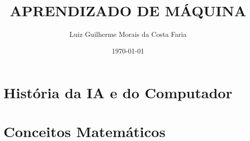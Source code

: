 \documentclass[
    12pt,            %
    a4paper,         %
    book,            %
    openright,       %
    twoside,         %
    brazil,          %
    citacao=authoryear
]{abntex2}
\title{APRENDIZADO DE MÁQUINA}
\author{Luiz Guilherme Morais da Costa Faria}
\date{\today} %
\begin{document}
\frontmatter

\imprimircapa
\imprimirfolhaderosto


\tableofcontents

\mainmatter

\part{História da IA e do Computador}




\part{Conceitos Matemáticos}
\end{document}
